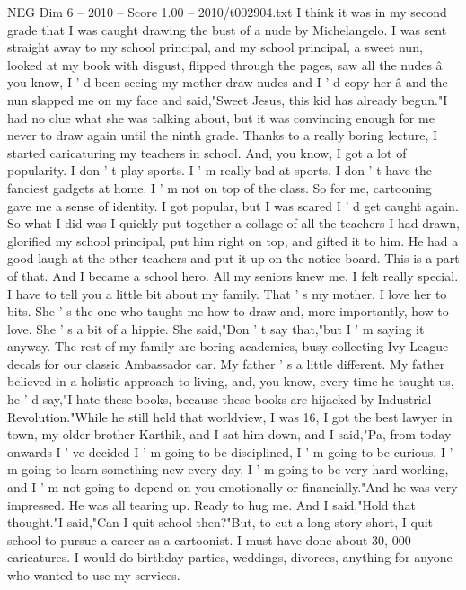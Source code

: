 \begin{textsample}{NEG Dim 6 – 2010 – Score 1.00 – 2010/t002904.txt}  \label{ex:f6_neg_040}
I think it was in my second grade that I was caught drawing the bust of a nude by Michelangelo.
I was sent straight away to my school principal, and my school principal, a sweet nun, looked at my book with disgust, flipped through the pages, saw all the nudes â you know, I ' d been seeing my mother draw nudes and I ' d copy her â and the nun slapped me on my face and said,"Sweet Jesus, this kid has already begun."I had no clue what she was talking about, but it was convincing enough for me never to draw again until the ninth grade.
Thanks to a really boring lecture, I started caricaturing my teachers in school.
And, you know, I got a lot of popularity.
I don ' t play sports.
I ' m really bad at sports.
I don ' t have the fanciest gadgets at home.
I ' m not on top of the class.
So for me, cartooning gave me a sense of identity.
I got popular, but I was scared I ' d get caught again.
So what I did was I quickly put together a collage of all the teachers I had drawn, glorified my school principal, put him right on top, and gifted it to him.
He had a good laugh at the other teachers and put it up on the notice board.
This is a part of that.
And I became a school hero.
All my seniors knew me.
I felt really special.
I have to tell you a little bit about my family.
That ' s my mother.
I love her to bits.
She ' s the one who taught me how to draw and, more importantly, how to love.
She ' s a bit of a hippie.
She said,"Don ' t say that,"but I ' m saying it anyway.
The rest of my family are boring academics, busy collecting Ivy League decals for our classic Ambassador car.
My father ' s a little different.
My father believed in a holistic approach to living, and, you know, every time he taught us, he ' d say,"I hate these books, because these books are hijacked by Industrial Revolution."While he still held that worldview, I was 16, I got the best lawyer in town, my older brother Karthik, and I sat him down, and I said,"Pa, from today onwards I ' ve decided I ' m going to be disciplined, I ' m going to be curious, I ' m going to learn something new every day, I ' m going to be very hard working, and I ' m not going to depend on you emotionally or financially."And he was very impressed.
He was all tearing up.
Ready to hug me.
And I said,"Hold that thought."I said,"Can I quit school then?"But, to cut a long story short, I quit school to pursue a career as a cartoonist.
I must have done about 30, 000 caricatures.
I would do birthday parties, weddings, divorces, anything for anyone who wanted to use my services.

\end{textsample}
